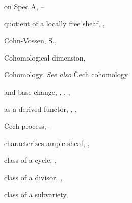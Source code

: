 {{\noindent\hspace*{7.5bp}on Spec A, --\par
\noindent\hspace*{7.5bp}quotient of a locally free sheaf, , \par
\noindent\hspace*{0.0bp}Cohn-Vossen, S., \par
\noindent\hspace*{0.0bp}Cohomological dimension, \par
\noindent\hspace*{0.0bp}Cohomology. \emph{See also} \v{C}ech cohomology\par
\noindent\hspace*{7.5bp}and base change, , , , \par
\noindent\hspace*{7.5bp}as a derived functor, , , \par
\noindent\hspace*{7.5bp}\v{C}ech process, --\par
\noindent\hspace*{7.5bp}characterizes ample sheaf, , \par
\noindent\hspace*{7.5bp}class of a cycle, , \par
\noindent\hspace*{7.5bp}class of a divisor, , \par
\noindent\hspace*{7.5bp}class of a subvariety, \par
}
}
